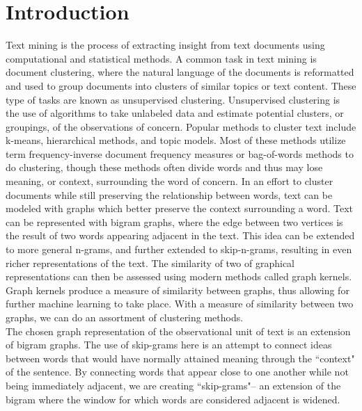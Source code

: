 %
%
%

\chapter{Introduction}
\label{introduction}


\hspace*{0.3cm} Text mining is the process of extracting insight from text documents using computational and statistical methods. A common task in text mining is document clustering, where the natural language of the documents is reformatted and used to group documents into clusters of similar topics or text content. These type of tasks are known as unsupervised clustering. Unsupervised clustering is the use of algorithms to take unlabeled data and estimate potential clusters, or groupings, of the observations of concern. Popular methods to cluster text include k-means, hierarchical methods, and topic models. Most of these methods utilize term frequency-inverse document frequency measures  or bag-of-words methods to do clustering, though these methods often divide words and thus may lose meaning, or context, surrounding the word of concern. In an effort to cluster documents while still preserving the relationship between words, text can be modeled with graphs which better preserve the context surrounding a word. Text can be represented with bigram graphs, where the edge between two vertices is the result of two words appearing adjacent in the text. This idea can be extended to more general n-grams, and further extended to skip-n-grams, resulting in even richer representations of the text. The similarity of two of graphical representations can then be assessed using modern methods called graph kernels. Graph kernels produce a measure of similarity between graphs, thus allowing for further machine learning to take place. With a measure of similarity between two graphs, we can do an assortment of clustering methods.\\

The chosen graph representation of the observational unit of text is an extension of bigram graphs. The use of skip-grams here is an attempt to connect ideas between words that would have normally attained meaning through the ``context" of the sentence. By connecting words that appear close to one another while not being immediately adjacent, we are creating ``skip-grams"-- an extension of the bigram where the window for which words are considered adjacent is widened.\\

